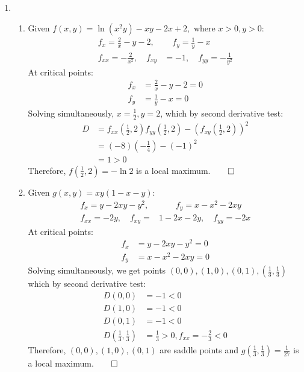 \documentclass[12pt, a4paper]{article}
\begin{document}
\begin{enumerate}[Q\arabic*.]
  \item 
    \begin{enumerate}[(\roman*)]
      \item Given $f(x,y) = \ln(x^2 y) - xy -2x +2,$ where $x>0, y>0$:
        \begin{align*}
          f_x = \frac{2}{x} - y -2,&\quad f_y = \frac{1}{y} - x\\
          f_{xx} = -\frac{2}{x^2},\quad f_{xy}&=-1,\quad f_{yy}=-\frac{1}{y^2}
        \end{align*}
        At critical points:
        \begin{align*}
          f_x &= \frac{2}{x} - y -2 = 0\\
          f_y &= \frac{1}{y} - x = 0
        \end{align*}
        Solving simultaneously, $x=\frac{1}{2}, y=2$, which by second derivative test:
        \begin{align*}
          D &= f_{xx}(\frac{1}{2}, 2)f_{yy}(\frac{1}{2}, 2) - (f_{xy}(\frac{1}{2}, 2))^2\\
            &= (-8)(-\frac{1}{4}) - (-1)^2\\
            &= 1 > 0
        \end{align*}
        Therefore, $f(\frac{1}{2}, 2) = -\ln 2$ is a local maximum.$\qed$

      \item Given $g(x,y) = xy(1-x-y)$:
        \begin{align*}
          f_x = y-2xy-y^2,&\quad\quad f_y = x-x^2-2xy\\
          f_{xx} = -2y,\quad f_{xy}=&1-2x-2y,\quad f_{yy}=-2x
        \end{align*}
        At critical points:
        \begin{align*}
          f_x &= y-2xy-y^2 = 0\\
          f_y &= x-x^2-2xy = 0
        \end{align*}
        Solving simultaneously, we get points $(0,0), (1,0), (0,1), (\frac{1}{3},\frac{1}{3})$ which by second derivative test:
        \begin{align*}
          D(0,0) &= -1 < 0\\
          D(1,0) &= -1 < 0\\
          D(0,1) &= -1 < 0\\
          D(\frac{1}{3},\frac{1}{3}) &= \frac{1}{3} > 0, f_{xx} = -\frac{2}{3} < 0
        \end{align*}
        Therefore, $(0,0), (1,0), (0,1)$ are saddle points and $g(\frac{1}{3},\frac{1}{3})=\frac{1}{27}$ is a local maximum.$\qed$ 
    \end{enumerate}
    \pagebreak


\end{enumerate}
\end{document}

